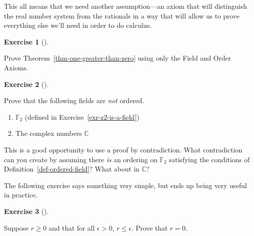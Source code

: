 \documentclass[
  letterpaper,
  DIV=11,
  numbers=noendperiod]{scrreprt}
\providecommand{\tightlist}{%
  \setlength{\itemsep}{0pt}\setlength{\parskip}{0pt}}
\theoremstyle{plain}
\theoremstyle{definition}
\newtheorem{exercise}{Exercise}[chapter]
\theoremstyle{plain}
\theoremstyle{plain}
\theoremstyle{definition}
\theoremstyle{definition}
\theoremstyle{remark}
\begin{document}
This all means that we need another assumption---an axiom that will
distinguish the real number system from the rationals in a way that will
allow us to prove everything else we'll need in order to do calculus.

\begin{exercise}[]\protect\hypertarget{exr-one-greater-than-zero}{}\label{exr-one-greater-than-zero}

Prove Theorem~\ref{thm-one-greater-than-zero} using only the Field and
Order Axioms.

\end{exercise}

\begin{exercise}[]\protect\hypertarget{exr-z2-not-ordered}{}\label{exr-z2-not-ordered}

Prove that the following fields are \emph{not} ordered.

\begin{enumerate}
\def\labelenumi{\arabic{enumi}.}
\tightlist
\item
  \(\mathbb{F}_2\) (defined in Exercise~\ref{exr-z2-is-a-field})
\item
  The complex numbers \(\mathbb{C}\)
\end{enumerate}

\end{exercise}

\begin{tcolorbox}[enhanced jigsaw, titlerule=0mm, opacitybacktitle=0.6, leftrule=.75mm, bottomrule=.15mm, left=2mm, arc=.35mm, colback=white, rightrule=.15mm, colframe=quarto-callout-tip-color-frame, toptitle=1mm, breakable, opacityback=0, colbacktitle=quarto-callout-tip-color!10!white, bottomtitle=1mm, title=\textcolor{quarto-callout-tip-color}{\faLightbulb}\hspace{0.5em}{Hint}, coltitle=black, toprule=.15mm]

This is a good opportunity to use a proof by contradiction. What
contradiction can you create by assuming there \emph{is} an ordering on
\(\mathbb{F}_2\) satisfying the conditions of
Definition~\ref{def-ordered-field}? What about in \(\mathbb{C}\)?

\end{tcolorbox}

The following exercise says something very simple, but ends up being
very useful in practice.

\begin{exercise}[]\protect\hypertarget{exr-nonnegative-less-than-all-epsilon}{}\label{exr-nonnegative-less-than-all-epsilon}

Suppose \(r\geq0\) and that for all \(\epsilon>0\), \(r\leq \epsilon\).
Prove that \(r=0\).

\end{exercise}
\end{document}
